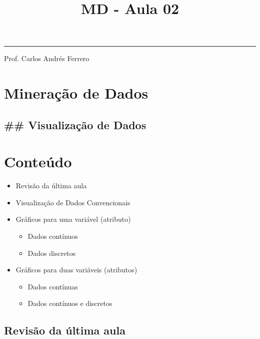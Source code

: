 \documentclass[11pt]{article}
\title{MD - Aula 02}
\begin{document}
    
    
    \maketitle
    
    

    
    \begin{center}\rule{0.5\linewidth}{\linethickness}\end{center}

Prof. Carlos Andrés Ferrero

\section{Mineração de Dados}\label{minerauxe7uxe3o-de-dados}

\subsection{\#\# Visualização de
Dados}\label{visualizauxe7uxe3o-de-dados}

    \section{Conteúdo}\label{conteuxfado}

\begin{itemize}
\item
  Revisão da última aula
\item
  Visualização de Dados Convencionais
\item
  Gráficos para uma variável (atributo)

  \begin{itemize}
  \item
    Dados contínuos
  \item
    Dados discretos
  \end{itemize}
\item
  Gráficos para duas variáveis (atributos)

  \begin{itemize}
  \item
    Dados contínuas
  \item
    Dados contínuos e discretos
  \end{itemize}
\end{itemize}

    \subsection{Revisão da última aula}\label{revisuxe3o-da-uxfaltima-aula}
\end{document}
